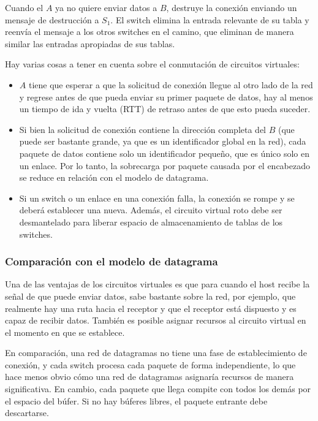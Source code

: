 Cuando el \(A\) ya no quiere enviar datos a \(B\), destruye la conexión enviando un mensaje de destrucción a \(S_1\). El switch elimina la entrada relevante de su tabla y reenvía el mensaje a los otros switches en el camino, que eliminan de manera similar las entradas apropiadas de sus tablas.

Hay varias cosas a tener en cuenta sobre el conmutación de circuitos virtuales:
\begin{itemize}
  \item \(A\) tiene que esperar a que la solicitud de conexión llegue al otro lado de la red y regrese antes de que pueda enviar su primer paquete de datos, hay al menos un tiempo de ida y vuelta (RTT) de retraso antes de que esto pueda suceder.
  \item Si bien la solicitud de conexión contiene la dirección completa del \(B\) (que puede ser bastante grande, ya que es un identificador global en la red), cada paquete de datos contiene solo un identificador pequeño, que es único solo en un enlace. Por lo tanto, la sobrecarga por paquete causada por el encabezado se reduce en relación con el modelo de datagrama.
  \item Si un switch o un enlace en una conexión falla, la conexión se rompe y se deberá establecer una nueva. Además, el circuito virtual roto debe ser desmantelado para liberar espacio de almacenamiento de tablas de los switches.
\end{itemize}

\subsubsection{Comparación con el modelo de datagrama}

Una de las ventajas de los circuitos virtuales es que para cuando el host recibe la señal de que puede enviar datos, sabe bastante sobre la red, por ejemplo, que realmente hay una ruta hacia el receptor y que el receptor está dispuesto y es capaz de recibir datos. También es posible asignar recursos al circuito virtual en el momento en que se establece.

En comparación, una red de datagramas no tiene una fase de establecimiento de conexión, y cada switch procesa cada paquete de forma independiente, lo que hace menos obvio cómo una red de datagramas asignaría recursos de manera significativa. En cambio, cada paquete que llega compite con todos los demás por el espacio del búfer. Si no hay búferes libres, el paquete entrante debe descartarse.

